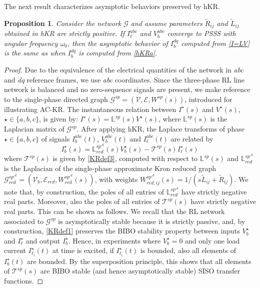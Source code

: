 \documentclass[a4paper]{article}
\theoremstyle{plain}
\newtheorem{prop}{Proposition}
\def\Lset{\mathbb{L}}
\newcommand{\AAA}{{\mathcal A}}
\newcommand{\EE}{{\mathcal E}}
\newcommand{\GG}{{\mathcal G}}
\newcommand{\T}{{\mathcal T}}
\newcommand{\VV}{{\mathcal V}}
\begin{document}
	The next result characterizes asymptotic behaviors preserved by hKR.
	\begin{prop}
          \label{prop:as_eq}
Consider the network $\GG$ and assume parameters $\tilde R_{ij}$ and $\tilde L_{ij}$ obtained in hKR are strictly positive. If $I_{\ell}^{abc}$ and $V_b^{abc}$ converge to PSSS with angular frequency $\omega_0$, then the \textit{asymptotic} behavior of $I_b^{dq}$ computed from \eqref{I=LV} is the same as when $I_b^{dq}$ is computed from \eqref{hKRa}.
	\end{prop}
	\begin{proof}
Due to the equivalence of the electrical quantities of the network in \emph{abc} and \emph{dq} reference frames, we use \emph{abc} coordinates. Since the three-phase RL line network is balanced and no zero-sequence signals are present, we make reference to the single-phase directed graph $\GG^{sp}=(\VV,\EE, W^{sp}(s))$, introduced for illustrating AC-KR. The instantaneous relation between $I^{\star}(s)$ and $V^{\star}(s)$, $\star \in \lbrace a,b,c \rbrace$, is given by: $I^{\star}(s)=\Lset^{sp}(s)V^{\star}(s)$, where $\Lset^{sp}(s)$ is the Laplacian matrix of $\GG^{sp}$. After applying hKR, the Laplace transforms of phase $\star \in \lbrace a,b,c \rbrace$ of signals $I_{b}^{abc}(t)$, $V_{b}^{abc}(t)$ and $I_{\ell}^{abc}(t)$ are related by
$$I^{\star}_b(s)=\Lset_{red}^{sp^{\AAA}}(s)V_b^{\star}(s)-\T^{sp}(s)I_{\ell}^{\star}(s)$$
where $\T^{sp}(s)$ is given by \eqref{KRdef3}, computed with respect to $\Lset^{sp}(s)$ and $\Lset_{red}^{sp^{\AAA}}$ is the Laplacian of the single-phase approximate Kron reduced graph $\GG^{sp^{\AAA}}_{red}=(\VV_b,\EE_{red},W^{sp^{\AAA}}_{red}(s))$, with weights $W_{red,ij}^{sp^{\AAA}}(s)=1/(s\tilde L_{ij}+\tilde R_{ij})$. We note that, by construction, the poles of all entries of $\Lset_{red}^{sp^{\AAA}}$ have strictly negative real parts. 
Moreover, also the poles of all entries of $\T^{sp}(s)$ have strictly negative real parts. This can be shown as follows. We recall that the RL network associated to $\GG^{sp}$ is asymptotically stable because it is strictly passive, and, by construction, \eqref{KRdef1} preserves the BIBO stability property between inputs $V_b^{\star}$ and $I^{\star}_{\ell}$ and output $I_b^{\star}$. Hence, in experiments where $V_b^{\star}=0$ and only one load current $I_{\ell_i}^{\star}(t)$ at time is excited, if $I_{\ell_i}^{\star}(t)$ is bounded, also all elements of $I_b^{\star}(t)$ are bounded. By the superposition principle, this shows that all elements of $\T^{sp}(s)$ are BIBO stable (and hence asymptotically stable) SISO transfer functions.


\end{proof}
\end{document}
